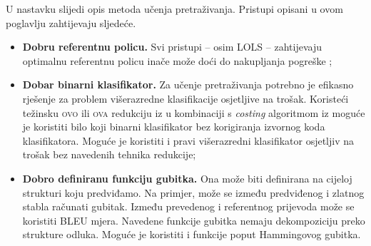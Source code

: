 U nastavku slijedi opis metoda učenja pretraživanja. Pristupi opisani u ovom
poglavlju zahtijevaju sljedeće.

\begin{itemize}

  \item \textbf{Dobru referentnu policu.} Svi pristupi -- osim \textsc{LOLS} --
  zahtijevaju optimalnu referentnu policu inače može doći do nakupljanja
  pogreške ;

  \item \textbf{Dobar binarni klasifikator.} Za učenje pretraživanja potrebno je
  efikasno rješenje za problem višerazredne klasifikacije osjetljive na trošak.
  Koristeći težinsku \textsc{ovo} ili \textsc{ova}  redukciju iz \citep{beygelzimer2005weighted,
  beygelzimer2005error} u kombinaciji s \textit{costing} algoritmom iz
  \citep{zadrozny2003cost} moguće je koristiti bilo koji binarni klasifikator
  bez korigiranja izvornog koda klasifikatora. Moguće je koristiti i pravi
  višerazredni klasifikator osjetljiv na trošak bez navedenih tehnika redukcije;

  \item \textbf{Dobro definiranu funkciju gubitka.} Ona može biti definirana na
  cijeloj strukturi koju predviđamo. Na primjer, može se između predviđenog i
  zlatnog stabla računati  gubitak. Između prevedenog i
  referentnog prijevoda može se koristiti BLEU  mjera. Navedene funkcije gubitka nemaju dekompoziciju preko
  strukture odluka. Moguće je koristiti i funkcije poput Hammingovog gubitka.

\end{itemize}
